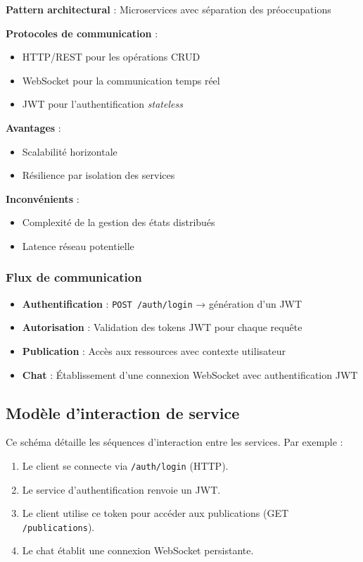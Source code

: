 \documentclass{rapportPfe}
\begin{document}
\textbf{Pattern architectural} : Microservices avec séparation des préoccupations

\textbf{Protocoles de communication} :
\begin{itemize}[label=--]
    \item HTTP/REST pour les opérations CRUD
    \item WebSocket pour la communication temps réel
    \item JWT pour l'authentification \textit{stateless}
\end{itemize}

\textbf{Avantages} :
\begin{itemize}[label=+]
    \item Scalabilité horizontale
    \item Résilience par isolation des services
\end{itemize}

\textbf{Inconvénients} :
\begin{itemize}[label=-]
    \item Complexité de la gestion des états distribués
    \item Latence réseau potentielle
\end{itemize}

\subsubsection*{Flux de communication}

\begin{itemize}
    \item \textbf{Authentification} : \texttt{POST /auth/login} → génération d'un JWT
    \item \textbf{Autorisation} : Validation des tokens JWT pour chaque requête
    \item \textbf{Publication} : Accès aux ressources avec contexte utilisateur
    \item \textbf{Chat} : Établissement d’une connexion WebSocket avec authentification JWT
\end{itemize}


\FloatBarrier
\subsection{Modèle d'interaction de service}

Ce schéma détaille les séquences d’interaction entre les services. Par exemple :

\begin{enumerate}
    \item Le client se connecte via \texttt{/auth/login} (HTTP).
    \item Le service d’authentification renvoie un JWT.
    \item Le client utilise ce token pour accéder aux publications (GET \texttt{/publications}).
    \item Le chat établit une connexion WebSocket persistante.
\end{enumerate}
\end{document}
